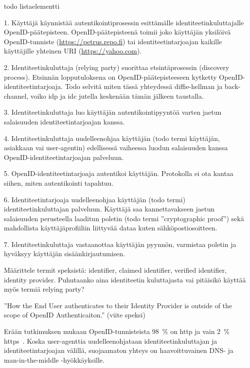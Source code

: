 \documentclass[finnish,gradu]{tktltiki}
\begin{document}
  todo listaelementti

  1. Käyttäjä käynnistää autentikointiprosessin esittämälle identiteetinkuluttajalle OpenID-päätepisteen. OpenID-päätepisteenä toimii joko käyttäjän yksilöivä OpenID-tunniste (\url{https://petrus.repo.fi}) tai identiteetintarjoajan kaikille käyttäjille yhteinen URI (\url{https://yahoo.com}).

  2. Identiteetinkuluttaja (relying party) suorittaa etsintäprosessin (discovery process). Etsinnän lopputuloksena on OpenID-päätepisteeseen kytketty OpenID-identiteetintarjoaja. Todo selvitä miten tässä yhteydessä diffie-hellman ja back-channel, voiko idp ja idc jutella keskenään tämän jälkeen taustalla.

  3. Identiteetinkuluttaja luo käyttäjän autentikointipyyntöä varten jaetun salaisuuden identiteetintarjoajan kanssa.

  4. Identiteetinkuluttaja uudelleenohjaa käyttäjän (todo termi käyttäjän, asiakkaan vai user-agentin) edellisessä vaiheessa luodun salaisuuden kanssa OpenID-identiteetintarjoajan palveluun.

  5. OpenID-identiteetintarjoaja autentikoi käyttäjän. Protokolla ei ota kantaa siihen, miten autentikointi tapahtuu.

  6. Identiteetintarjoaja uudelleenohjaa käyttäjän (todo termi) identiteetinkuluttajan palveluun. Käyttäjä saa kannettavakseen jaetun salaisuuden perusteella laaditun poletin (todo termi ''cryptographic proof'') sekä mahdollista käyttäjäprofiiliin liittyvää dataa kuten sähköpostiosoitteen.

  7. Identiteetinkuluttaja vastaanottaa käyttäjän pyynnön, varmistaa poletin ja hyväksyy käyttäjän sisäänkirjautumisen.


  Määrittele termit speksistä: identifier, claimed identifier, verified identifier, identity provider.
  Puhutaanko aina identiteetin kuluttajasta vai pitäisikö käyttää myös termiä relying party?

  ''How the End User authenticates to their Identity Provider is outside of the scope of OpenID Authenticaiton.'' (viite speksi)

  Erään tutkimuksen mukaan OpenID-tunnisteista 98~\% on http ja vain 2~\% https~\cite{openid_identifier_survey_2011}.
  Koska user-agenttia uudelleenohjataan identiteetinkuluttajan ja identiteetintarjoajan välillä, suojaamaton yhteys on haavoittuvainen DNS- ja man-in-the-middle -hyökkäyksille.
\end{document}
